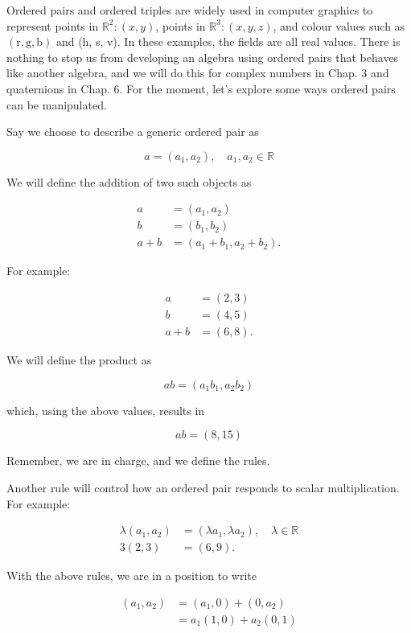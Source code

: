 \documentclass[10pt]{article}
\begin{document}
Ordered pairs and ordered triples are widely used in computer graphics to represent points in $\mathbb{R}^{2}:(x, y)$, points in $\mathbb{R}^{3}:(x, y, z)$, and colour values such as $(\mathrm{r}, \mathrm{g}, \mathrm{b})$ and (h, s, v). In these examples, the fields are all real values. There is nothing to stop us from developing an algebra using ordered pairs that behaves like another algebra, and we will do this for complex numbers in Chap. 3 and quaternions in Chap. 6. For the moment, let's explore some ways ordered pairs can be manipulated.

Say we choose to describe a generic ordered pair as

$$
a=\left(a_{1}, a_{2}\right), \quad a_{1}, a_{2} \in \mathbb{R}
$$

We will define the addition of two such objects as

$$
\begin{aligned}
a & =\left(a_{1}, a_{2}\right) \\
b & =\left(b_{1}, b_{2}\right) \\
a+b & =\left(a_{1}+b_{1}, a_{2}+b_{2}\right) .
\end{aligned}
$$

For example:

$$
\begin{aligned}
a & =(2,3) \\
b & =(4,5) \\
a+b & =(6,8) .
\end{aligned}
$$

We will define the product as

$$
a b=\left(a_{1} b_{1}, a_{2} b_{2}\right)
$$

which, using the above values, results in

$$
a b=(8,15)
$$

Remember, we are in charge, and we define the rules.

Another rule will control how an ordered pair responds to scalar multiplication. For example:

$$
\begin{aligned}
\lambda\left(a_{1}, a_{2}\right) & =\left(\lambda a_{1}, \lambda a_{2}\right), \quad \lambda \in \mathbb{R} \\
3(2,3) & =(6,9) .
\end{aligned}
$$

With the above rules, we are in a position to write

$$
\begin{aligned}
\left(a_{1}, a_{2}\right) & =\left(a_{1}, 0\right)+\left(0, a_{2}\right) \\
& =a_{1}(1,0)+a_{2}(0,1)
\end{aligned}
$$
\end{document}
